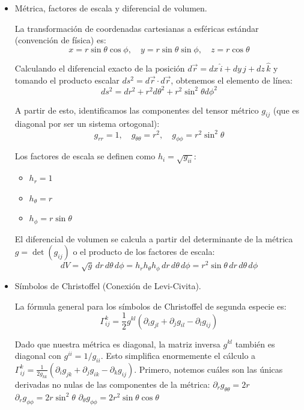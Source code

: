 \documentclass[11pt,spanish]{article}
\begin{document}
\begin{itemize}
\item Métrica, factores de escala y diferencial de volumen.

La transformación de coordenadas cartesianas a esféricas estándar (convención de física) es:
$$x = r \sin\theta \cos\phi, \quad y = r \sin\theta \sin\phi, \quad z = r \cos\theta$$

Calculando el diferencial exacto de la posición $d\vec{r} = dx\,\hat{i} + dy\,\hat{j} + dz\,\hat{k}$ y tomando el producto escalar $ds^2 = d\vec{r} \cdot d\vec{r}$, obtenemos el elemento de línea:
$$ds^2 = dr^2 + r^2 d\theta^2 + r^2 \sin^2\theta d\phi^2$$

A partir de esto, identificamos las componentes del tensor métrico $g_{ij}$ (que es diagonal por ser un sistema ortogonal):
$$g_{rr} = 1, \quad g_{\theta\theta} = r^2, \quad g_{\phi\phi} = r^2 \sin^2\theta$$

Los factores de escala se definen como $h_i = \sqrt{g_{ii}}$:
\begin{itemize}
\item $h_r = 1$
\item $h_\theta = r$
\item $h_\phi = r \sin\theta$
\end{itemize}

El diferencial de volumen se calcula a partir del determinante de la métrica $g = \det(g_{ij})$ o el producto de los factores de escala:
$$
dV = \sqrt{g} \, dr \, d\theta \, d\phi = h_r h_\theta h_\phi \, dr \, d\theta \, d\phi = r^2 \sin\theta \, dr \, d\theta \, d\phi
$$

\item Símbolos de Christoffel (Conexión de Levi-Civita).

La fórmula general para los símbolos de Christoffel de segunda especie es:
$$\Gamma^k_{ij} = \frac{1}{2} g^{kl} (\partial_i g_{jl} + \partial_j g_{il} - \partial_l g_{ij})$$

Dado que nuestra métrica es diagonal, la matriz inversa $g^{kl}$ también es diagonal con $g^{ii} = 1/g_{ii}$. Esto simplifica enormemente el cálculo a $\Gamma^k_{ij} = \frac{1}{2g_{kk}} (\partial_i g_{jk} + \partial_j g_{ik} - \partial_k g_{ij})$.
Primero, notemos cuáles son las únicas derivadas no nulas de las componentes de la métrica:
$\partial_r g_{\theta\theta} = 2r$
$\partial_r g_{\phi\phi} = 2r\sin^2\theta$
$\partial_\theta g_{\phi\phi} = 2r^2\sin\theta\cos\theta$


\end{itemize}
\end{document}
